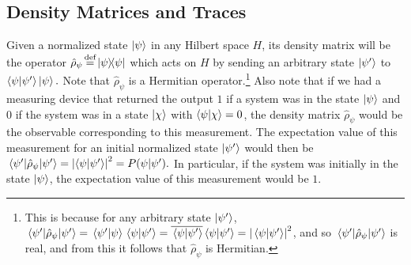     \subsection{Density Matrices and Traces}
    Given a normalized state $\ket{\psi}$ in any Hilbert space $H$,  
    its density matrix will be the operator $\hat{\rho}_\psi\myeq\dyad{\psi}$ %
%
    which  %
%
    acts on $H$ by sending an arbitrary state $\ket{\psi'}$ to $\ip{\psi}{\psi'}\ket{\psi}.$  Note that $\hat{\rho}_\psi$ is a Hermitian operator.\footnote{This is because for any arbitrary state $\ket{\psi'}$, $\ev*{\hat{\rho}_\psi}{{\psi'}} = \ip*{\psi'}{\psi} \ip*{\psi}{\psi'}=\overline{\ip*{\psi}{\psi'}}\ip*{\psi}{\psi'}=\abs{\ip*{\psi}{\psi'}}^2$, and so $\ev*{\hat{\rho}_\psi}{{\psi'}}$ is real, and from this it follows that $\hat{\rho}_\psi$ is Hermitian. } Also note that if we had a measuring device that returned the output $1$ if a system was in the state $\ket{\psi}$ and $0$ if the system was in a state $\ket{\chi}$ with $\ip{\psi}{\chi}=0$, the density matrix $\hat{\rho}_\psi$ would be the observable corresponding to this measurement. The expectation value of this measurement for an initial normalized state $\ket{\psi'}$ would then be $\ev*{\hat{\rho}_\psi}{\psi'}=\abs{\ip{\psi}{\psi'}}^2=P(\psi|\psi').$ In particular, if the system was initially in the state $\ket{\psi}$, the expectation value of this measurement would be $1$.
    
